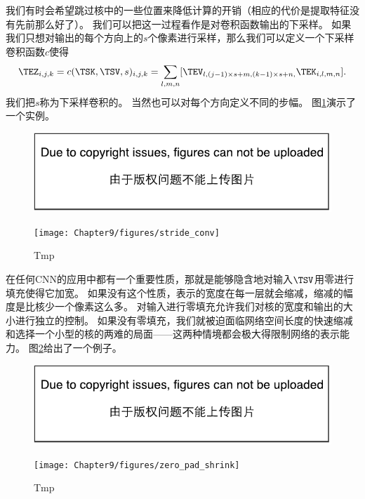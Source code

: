 我们有时会希望跳过核中的一些位置来降低计算的开销（相应的代价是提取特征没有先前那么好了）。
我们可以把这一过程看作是对卷积函数输出的下采样。
如果我们只想对输出的每个方向上的$s$个像素进行采样，那么我们可以定义一个下采样卷积函数$c$使得
\begin{equation}
\TEZ_{i,j,k} = c(\TSK, \TSV, s)_{i,j,k} = \sum_{l,m,n} [\TEV_{l,(j-1)\times s+m, (k-1)\times s +n,}
 \TEK_{i,l,m,n}].
 \label{eq: 9.8}
\end{equation}
我们把$s$称为下采样卷积的。
当然也可以对每个方向定义不同的步幅。
图\ref{fig:chap9_stride_conv}演示了一个实例。
\begin{figure}[!htb]
\ifOpenSource
\centerline{\includegraphics{figure.pdf}}
\else
\centerline{\texttt{[image: Chapter9/figures/stride\_conv]}}
\fi
\caption{Tmp}
\label{fig:chap9_stride_conv}
\end{figure}

在任何\gls{CNN}的应用中都有一个重要性质，那就是能够隐含地对输入$\TSV$用零进行填充使得它加宽。
如果没有这个性质，表示的宽度在每一层就会缩减，缩减的幅度是比核少一个像素这么多。
对输入进行零填充允许我们对核的宽度和输出的大小进行独立的控制。
如果没有零填充，我们就被迫面临网络空间长度的快速缩减和选择一个小型的核的两难的局面——这两种情境都会极大得限制网络的表示能力。
图\ref{fig:chap9_zero_pad_shrink}给出了一个例子。
\begin{figure}[!htb]
\ifOpenSource
\centerline{\includegraphics{figure.pdf}}
\else
\centerline{\texttt{[image: Chapter9/figures/zero\_pad\_shrink]}}
\fi
\caption{Tmp}
\label{fig:chap9_zero_pad_shrink}
\end{figure}

